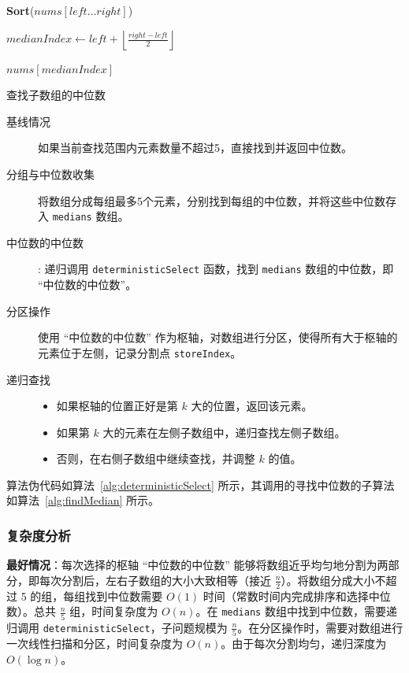     \begin{algorithm}[htbp]
        \label{alg:findMedian}
        \SetAlgoLined
        \DontPrintSemicolon
        
        \textbf{Sort}($nums[left \dots right]$)\;
        
        $medianIndex \leftarrow left + \left\lfloor \frac{right - left}{2} \right\rfloor$\;
        
        \Return $nums[medianIndex]$\;
        
        \caption{查找子数组的中位数}
    \end{algorithm}

    \begin{description}
        \item[基线情况] 如果当前查找范围内元素数量不超过5，直接找到并返回中位数。
        \item[分组与中位数收集] 将数组分成每组最多5个元素，分别找到每组的中位数，并将这些中位数存入 \texttt{medians} 数组。
        \item[中位数的中位数]: 递归调用 \texttt{deterministicSelect} 函数，找到 \texttt{medians} 数组的中位数，即 ``中位数的中位数''。
        \item[分区操作] 使用 ``中位数的中位数'' 作为枢轴，对数组进行分区，使得所有大于枢轴的元素位于左侧，记录分割点 \texttt{storeIndex}。
        \item[递归查找] \begin{itemize}
            \item 如果枢轴的位置正好是第 $k$ 大的位置，返回该元素。
            \item 如果第 $k$ 大的元素在左侧子数组中，递归查找左侧子数组。
            \item 否则，在右侧子数组中继续查找，并调整 $k$ 的值。
        \end{itemize}
    \end{description}

    算法伪代码如算法~\autoref{alg:deterministicSelect} 所示，其调用的寻找中位数的子算法如算法~\autoref{alg:findMedian} 所示。
\subsubsection{复杂度分析}

\textbf{最好情况}：每次选择的枢轴 ``中位数的中位数'' 能够将数组近乎均匀地分割为两部分，即每次分割后，左右子数组的大小大致相等（接近 \( \frac{n}{2} \)）。将数组分成大小不超过 5 的组，每组找到中位数需要 \( O(1) \) 时间（常数时间内完成排序和选择中位数）。总共 \( \frac{n}{5} \) 组，时间复杂度为 \( O(n) \)。在 \texttt{medians} 数组中找到中位数，需要递归调用 \texttt{deterministicSelect}，子问题规模为 \( \frac{n}{5} \)。在分区操作时，需要对数组进行一次线性扫描和分区，时间复杂度为 \( O(n) \)。由于每次分割均匀，递归深度为 \( O(\log n) \)。

